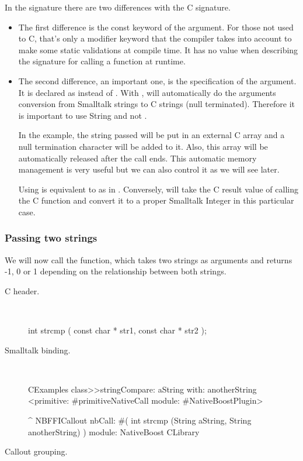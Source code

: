 \documentclass[a4paper,10pt,twoside]{book}
\begin{document}
In the signature  there are two differences with the C signature. 
\begin{itemize}
\item  The first difference is the const keyword of the argument. For those not used to C, 
that's only a modifier keyword that the compiler takes into account to
make some static validations at compile time. It has no
value when describing the signature for calling a function at
runtime.

\item The second difference, an important one, is the specification of the argument.
It is declared as  instead of . 
With , \NativeBoost will automatically do the arguments conversion from Smalltalk strings to C strings (null terminated).
Therefore it is important to use String and not . 

In the example, the string passed will be put in an external C  array and a null termination character will be added to it. 
Also, this array will be automatically released after the call ends. 
This automatic memory management is very useful but we can also control it as we will see later.

Using  is equivalent to  as in . 
Conversely, \NativeBoost will take the C result value of calling the C function and convert it to a proper Smalltalk  Integer in this particular case.
\end{itemize}


\subsubsection{Passing two strings}
We will now call the  function, which takes two strings as arguments and returns -1, 0 or 1 depending on the relationship between both strings.

\begin{description}
\item [C header.] \ 

\begin{code}{}
int strcmp ( const char * str1, const char * str2 );
\end{code}

\item [Smalltalk binding.] \ 

\begin{code}{}
CExamples class>>stringCompare: aString with: anotherString
	<primitive: #primitiveNativeCall module: #NativeBoostPlugin>
	
	^ NBFFICallout nbCall: #( int strcmp (String aString, String anotherString) ) module: NativeBoost CLibrary
\end{code}


\item [Callout grouping.] \ 
 

\end{description}
\end{document}
